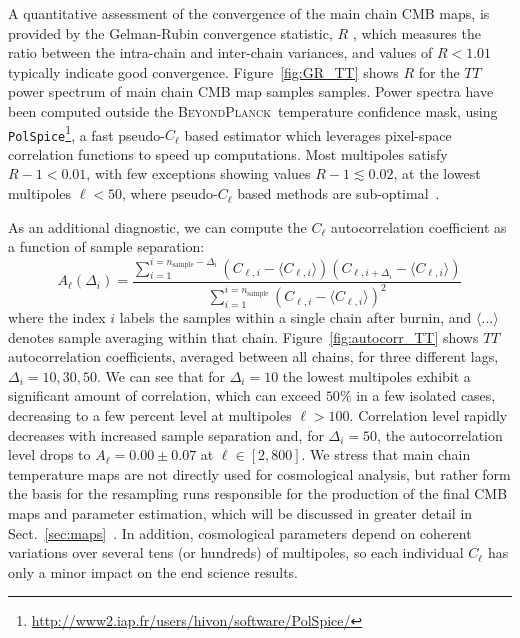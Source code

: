 \documentclass[twocolumn]{aa}
\newcommand{\red}[0]{\color{red}}
\newcommand{\BP}{\textsc{BeyondPlanck}}
\begin{document}
{\red A  quantitative assessment of the convergence of the main chain CMB maps, is provided by the Gelman-Rubin convergence statistic, $R$ \citep{gelman:1992}, which measures the ratio between the intra-chain and inter-chain variances, and values of $R < 1.01$ typically indicate good convergence. Figure~\ref{fig:GR_TT} shows $R$ for the $TT$ power spectrum of main chain CMB map samples samples. Power spectra have been computed outside the \BP\ temperature confidence mask, using \texttt{PolSpice}\footnote{\url{http://www2.iap.fr/users/hivon/software/PolSpice/}}, a fast pseudo-$C_\ell$ based estimator which leverages pixel-space correlation functions to speed up computations. Most multipoles satisfy $R-1 < 0.01$, with few exceptions showing values $R-1 \lesssim 0.02$, at the lowest multipoles $\ell < 50$, where pseudo-$C_\ell$ based methods are sub-optimal~\citep[e.g.,][]{GerbinoLike}.

  As an additional diagnostic, we can compute the $C_\ell$ autocorrelation coefficient as a function of sample separation:
\begin{equation}
  A_{\ell} (\Delta_i)  =  \frac{\sum_{i=1}^{i=n_{\mathrm{sample}}-\Delta_i} (C_{\ell,i} - \langle C_{\ell,i} \rangle) (C_{\ell,i+\Delta_i} - \langle C_{\ell,i} \rangle)}{\sum_{i=1}^{i=n_{\mathrm{sample}}} (C_{\ell,i} - \langle C_{\ell,i} \rangle)^2}
  \label{eq:autocorr}
\end{equation}
where the index $i$ labels the samples within a single chain after burnin, and $\langle ... \rangle$ denotes sample averaging within that chain. Figure~\ref{fig:autocorr_TT} shows $TT$ autocorrelation coefficients, averaged between all chains, for three different lags, $\Delta_i = 10, 30, 50$. We can see that for $\Delta_i = 10$ the lowest multipoles exhibit a significant amount of correlation, which can exceed $50\%$ in a few isolated cases, decreasing to a few percent level at multipoles $\ell > 100$. Correlation level rapidly decreases with increased sample separation and, for $\Delta_i = 50$, the autocorrelation level drops to $A_\ell = 0.00 \pm 0.07$ at $\ell \in [2,800]$. We stress that main chain temperature maps are not directly used for cosmological analysis, but rather form the basis for the resampling runs responsible for the production of the final CMB maps and parameter estimation, which will be discussed in greater detail in Sect.~\ref{sec:maps}~\citep[also see][]{bp12}. In addition, cosmological parameters depend on coherent variations over several tens (or hundreds) of multipoles, so each individual $C_\ell$ has only a minor impact on the end science results.   

}
\end{document}
